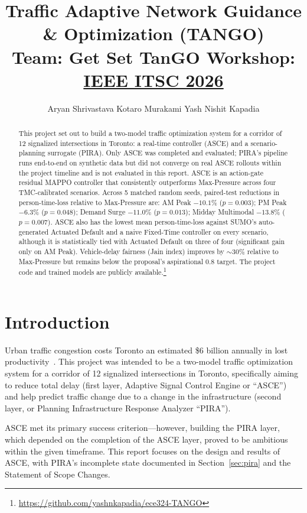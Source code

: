 \documentclass{article}
\title{Traffic Adaptive Network Guidance \& Optimization (TANGO)\\
\vspace{0.3em}
\small Team: Get Set TanGO \quad Workshop: \href{https://ieee-itsc.org/2026/}{IEEE ITSC 2026}}
\author{%
  Aryan Shrivastava \And
  Kotaro Murakami \And
  Yash Nishit Kapadia
}
\begin{document}
\maketitle

\begin{abstract}
This project set out to build a two-model traffic optimization system for a corridor of 12 signalized intersections in Toronto: a real-time controller (ASCE) and a scenario-planning surrogate (PIRA). Only ASCE was completed and evaluated; PIRA's pipeline runs end-to-end on synthetic data but did not converge on real ASCE rollouts within the project timeline and is not evaluated in this report. ASCE is an action-gate residual MAPPO controller that consistently outperforms Max-Pressure across four TMC-calibrated scenarios. Across 5 matched random seeds, paired-test reductions in person-time-loss relative to Max-Pressure are: AM Peak $-10.1\%$ ($p\!=\!0.003$); PM Peak $-6.3\%$ ($p\!=\!0.048$); Demand Surge $-11.0\%$ ($p\!=\!0.013$); Midday Multimodal $-13.8\%$ ($p\!=\!0.007$). ASCE also has the lowest mean person-time-loss against SUMO's auto-generated Actuated Default and a naive Fixed-Time controller on every scenario, although it is statistically tied with Actuated Default on three of four (significant gain only on AM Peak). Vehicle-delay fairness (Jain index) improves by ${\sim}30\%$ relative to Max-Pressure but remains below the proposal's aspirational 0.8 target. The project code and trained models are publicly available.\footnote{\url{https://github.com/yashnkapadia/ece324-TANGO}}
\end{abstract}

\section{Introduction}

Urban traffic congestion costs Toronto an estimated \$6 billion annually in lost productivity~\cite{cbc_gridlock}. This project was intended to be a two-model traffic optimization system for a corridor of 12 signalized intersections in Toronto, specifically aiming to reduce total delay (first layer, Adaptive Signal Control Engine or ``ASCE'') and help predict traffic change due to a change in the infrastructure (second layer, or Planning Infrastructure Response Analyzer ``PIRA'').

ASCE met its primary success criterion---however, building the PIRA layer, which depended on the completion of the ASCE layer, proved to be ambitious within the given timeframe. This report focuses on the design and results of ASCE, with PIRA's incomplete state documented in Section~\ref{sec:pira} and the Statement of Scope Changes.
\end{document}
